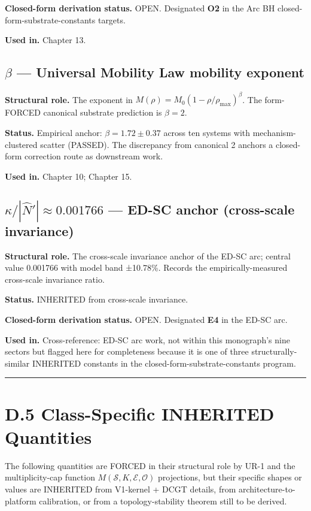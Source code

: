 \documentclass[11pt]{book}
\begin{document}
\textbf{Closed-form derivation status.} OPEN. Designated \textbf{O2} in the Arc BH closed-form-substrate-constants targets.

\textbf{Used in.} Chapter 13.

\subsection{$\beta$ — Universal Mobility Law mobility exponent}

\textbf{Structural role.} The exponent in $M(\rho) = M_0(1 - \rho/\rho_\mathrm{max})^\beta$. The form-FORCED canonical substrate prediction is $\beta = 2$.

\textbf{Status.} Empirical anchor: $\beta = 1.72 \pm 0.37$ across ten systems with mechanism-clustered scatter (PASSED). The discrepancy from canonical 2 anchors a closed-form correction route as downstream work.

\textbf{Used in.} Chapter 10; Chapter 15.

\subsection{$\kappa/|\hat{N}'| \approx 0.001766$ — ED-SC anchor (cross-scale invariance)}

\textbf{Structural role.} The cross-scale invariance anchor of the ED-SC arc; central value 0.001766 with model band ±10.78\%. Records the empirically-measured cross-scale invariance ratio.

\textbf{Status.} INHERITED from cross-scale invariance.

\textbf{Closed-form derivation status.} OPEN. Designated \textbf{E4} in the ED-SC arc.

\textbf{Used in.} Cross-reference: ED-SC arc work, not within this monograph's nine sectors but flagged here for completeness because it is one of three structurally-similar INHERITED constants in the closed-form-substrate-constants program.

\bigskip\hrule\bigskip

\section{D.5 Class-Specific INHERITED Quantities}

The following quantities are FORCED in their structural role by UR-1 and the multiplicity-cap function $M(\mathcal{S}, K, \mathcal{E}, \mathcal{O})$ projections, but their specific shapes or values are INHERITED from V1-kernel + DCGT details, from architecture-to-platform calibration, or from a topology-stability theorem still to be derived.
\end{document}

